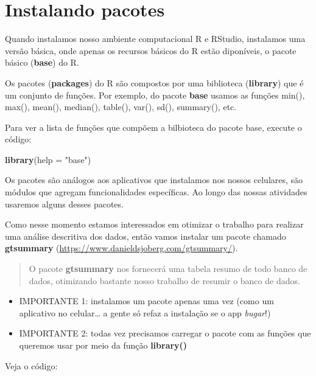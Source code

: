 \documentclass[
]{book}
\newenvironment{Shaded}{\begin{snugshade}}{\end{snugshade}}
\newcommand{\AttributeTok}[1]{\textcolor[rgb]{0.13,0.29,0.53}{#1}}
\newcommand{\FunctionTok}[1]{\textcolor[rgb]{0.13,0.29,0.53}{\textbf{#1}}}
\newcommand{\NormalTok}[1]{#1}
\newcommand{\StringTok}[1]{\textcolor[rgb]{0.31,0.60,0.02}{#1}}
\begin{document}
\chapter{Instalando pacotes}\label{instalando-pacotes}

Quando instalamos nosso ambiente computacional R e RStudio, instalamos uma versão básica, onde apenas os recursos básicos do R estão diponíveis, o pacote básico (\textbf{base}) do R.

Os pacotes (\textbf{packages}) do R são compostos por uma biblioteca (\textbf{library}) que é um conjunto de funções. Por exemplo, do pacote \textbf{base} usamos as funções min(), max(), mean(), median(), table(), var(), sd(), summary(), etc.

Para ver a lista de funções que compõem a bilbioteca do pacote base, execute o código:

\begin{Shaded}
\begin{Highlighting}[]
\FunctionTok{library}\NormalTok{(}\AttributeTok{help =} \StringTok{"base"}\NormalTok{)}
\end{Highlighting}
\end{Shaded}

Os pacotes são análogos aos aplicativos que instalamos nos nossos celulares, são módulos que agregam funcionalidades específicas. Ao longo das nossas atividades usaremos alguns desses pacotes.

Como nesse momento estamos interessados em otimizar o trabalho para realizar uma análise descritiva dos dados, então vamos instalar um pacote chamado \textbf{gtsummary} (\url{https://www.danieldsjoberg.com/gtsummary/}).

\begin{quote}
O pacote \textbf{gtsummary} nos fornecerá uma tabela resumo de todo banco de dados, otimizando bastante nosso trabalho de resumir o banco de dados.
\end{quote}

\begin{itemize}
\item
  IMPORTANTE 1: instalamos um pacote apenas uma vez (como um aplicativo no celular\ldots{} a gente só refaz a instalação se o app \emph{bugar}!)
\item
  IMPORTANTE 2: todas vez precisamos carregar o pacote com as funções que queremos usar por meio da função \textbf{library()}
\end{itemize}

Veja o código:
\end{document}
